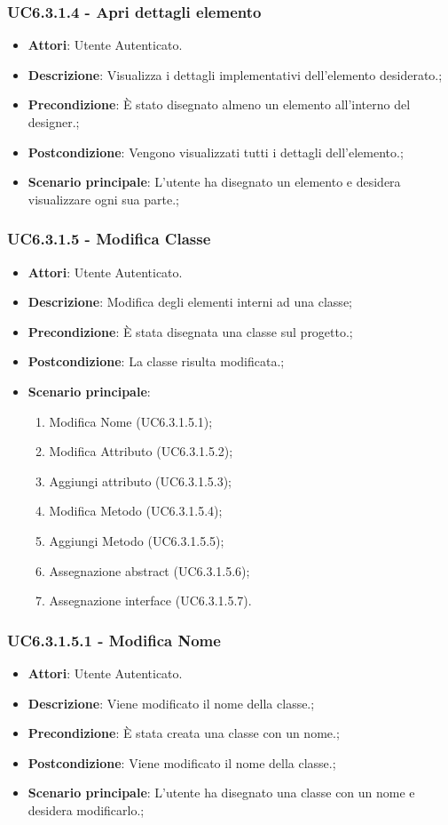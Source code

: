 \subsubsection{UC6.3.1.4 - Apri dettagli elemento} 
\label{sssec:UC6.3.1.4} 
\begin{itemize} 
\item \textbf{Attori}: Utente Autenticato.
\item \textbf{Descrizione}: Visualizza i dettagli implementativi dell'elemento desiderato.;
\item \textbf{Precondizione}: È stato disegnato almeno un elemento all'interno del designer.;
\item \textbf{Postcondizione}: Vengono visualizzati tutti i dettagli dell'elemento.;
\item \textbf{Scenario principale}: L'utente ha disegnato un elemento e desidera visualizzare ogni sua parte.;\end{itemize} 
\subsubsection{UC6.3.1.5 - Modifica Classe} 
\label{sssec:UC6.3.1.5} 
\begin{itemize} 
\item \textbf{Attori}: Utente Autenticato.
\item \textbf{Descrizione}: Modifica degli elementi interni ad una classe;
\item \textbf{Precondizione}: È stata disegnata una classe sul progetto.;
\item \textbf{Postcondizione}: La classe risulta modificata.;
\item \textbf{Scenario principale}: \begin{enumerate}\item Modifica Nome (UC6.3.1.5.1);\item Modifica Attributo (UC6.3.1.5.2);\item Aggiungi attributo (UC6.3.1.5.3);\item Modifica Metodo (UC6.3.1.5.4);\item Aggiungi Metodo (UC6.3.1.5.5);\item Assegnazione abstract (UC6.3.1.5.6);\item Assegnazione interface (UC6.3.1.5.7). 
 \end{enumerate}
\end{itemize} 
\subsubsection{UC6.3.1.5.1 - Modifica Nome} 
\label{sssec:UC6.3.1.5.1} 
\begin{itemize} 
\item \textbf{Attori}: Utente Autenticato.
\item \textbf{Descrizione}: Viene modificato il nome della classe.;
\item \textbf{Precondizione}: È stata creata una classe con un nome.;
\item \textbf{Postcondizione}: Viene modificato il nome della classe.;
\item \textbf{Scenario principale}: L'utente ha disegnato una classe con un nome e desidera modificarlo.;\end{itemize} 
